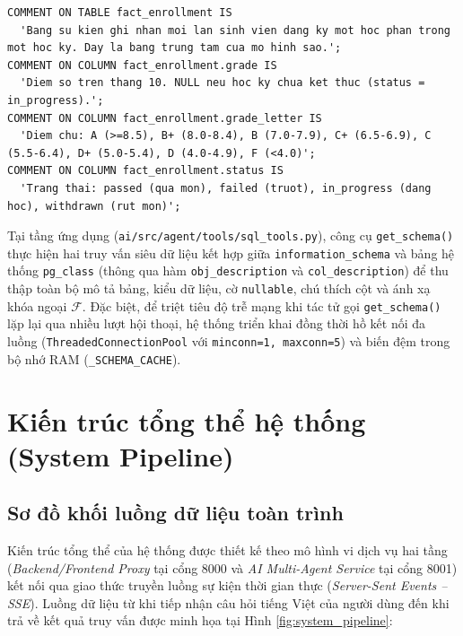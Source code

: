 \documentclass[12pt,a4paper]{report}
\begin{document}
\begin{lstlisting}[style=sqlstyle, caption={Trích đoạn định nghĩa bảng và gắn chú thích ngữ nghĩa tiếng Việt trong \texttt{fe\_be/schema.sql}.}, label={lst:schema_comments}]
COMMENT ON TABLE fact_enrollment IS
  'Bang su kien ghi nhan moi lan sinh vien dang ky mot hoc phan trong mot hoc ky. Day la bang trung tam cua mo hinh sao.';
COMMENT ON COLUMN fact_enrollment.grade IS
  'Diem so tren thang 10. NULL neu hoc ky chua ket thuc (status = in_progress).';
COMMENT ON COLUMN fact_enrollment.grade_letter IS
  'Diem chu: A (>=8.5), B+ (8.0-8.4), B (7.0-7.9), C+ (6.5-6.9), C (5.5-6.4), D+ (5.0-5.4), D (4.0-4.9), F (<4.0)';
COMMENT ON COLUMN fact_enrollment.status IS
  'Trang thai: passed (qua mon), failed (truot), in_progress (dang hoc), withdrawn (rut mon)';
\end{lstlisting}

Tại tầng ứng dụng (\texttt{ai/src/agent/tools/sql\_tools.py}), công cụ \texttt{get\_schema()} thực hiện hai truy vấn siêu dữ liệu kết hợp giữa \texttt{information\_schema} và bảng hệ thống \texttt{pg\_class} (thông qua hàm \texttt{obj\_description} và \texttt{col\_description}) để thu thập toàn bộ mô tả bảng, kiểu dữ liệu, cờ \texttt{nullable}, chú thích cột và ánh xạ khóa ngoại $\mathcal{F}$. Đặc biệt, để triệt tiêu độ trễ mạng khi tác tử gọi \texttt{get\_schema()} lặp lại qua nhiều lượt hội thoại, hệ thống triển khai đồng thời hồ kết nối đa luồng (\texttt{ThreadedConnectionPool} với \texttt{minconn=1, maxconn=5}) và biến đệm trong bộ nhớ RAM (\texttt{\_SCHEMA\_CACHE}).

\section{Kiến trúc tổng thể hệ thống (System Pipeline)}

\subsection{Sơ đồ khối luồng dữ liệu toàn trình}

Kiến trúc tổng thể của hệ thống được thiết kế theo mô hình vi dịch vụ hai tầng (\textit{Backend/Frontend Proxy} tại cổng 8000 và \textit{AI Multi-Agent Service} tại cổng 8001) kết nối qua giao thức truyền luồng sự kiện thời gian thực (\textit{Server-Sent Events -- SSE}). Luồng dữ liệu từ khi tiếp nhận câu hỏi tiếng Việt của người dùng đến khi trả về kết quả truy vấn được minh họa tại Hình \ref{fig:system_pipeline}:
\end{document}
